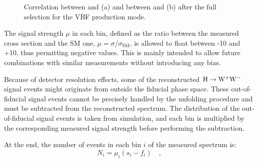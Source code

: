 \begin{figure}[htb]
\centering
{}
\caption{Correlation between \pth and \mll (a) and between \pth and \mt (b) after the full selection for the VBF production mode.\label{fig:correlation_vbf}}
\end{figure}

The signal strength $\mu$ in each bin, defined as the ratio between the measured cross section and the SM one, $\mu = \sigma/\sigma_\mathrm{SM}$, is allowed to float between -10 and +10, thus permitting negative values. This is mainly intended to allow future combinations with similar measurements without introducing any bias.

Because of detector resolution effects, some of the reconstructed ${\mathrm{H}\to\mathrm{W^+W^-}}$ signal events might originate from outside the fiducial phase space.  
These out-of-fiducial signal events cannot be precisely handled by the unfolding procedure and must be subtracted from the reconstructed spectrum. The \pth distribution of the out-of-fiducial signal events is taken from simulation, and each bin is multiplied by the corresponding measured signal strength before performing the subtraction. 

At the end, the number of events in each bin $i$ of the measured spectrum is:
\begin{equation}\label{eq:sig_yield}
N_i = \mu_i (s_i -f_i) \quad ,
\end{equation}

